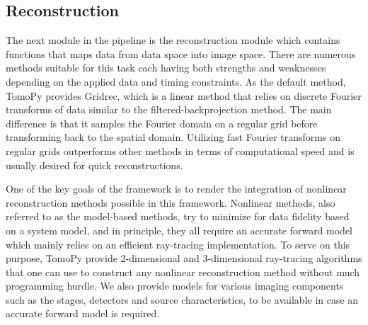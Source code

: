 \documentclass[pdf]{iucr}              %
\begin{document}
\subsection{Reconstruction}

The next module in the pipeline is the reconstruction module which contains functions that maps data from data space into image space. There are numerous methods suitable for this task each having both strengths and weaknesses depending on the applied data and timing constraints. As the default method, TomoPy provides Gridrec, which is a linear method that relies on discrete Fourier transforms of data similar to the filtered-backprojection method. The main difference is that it samples the Fourier domain on a regular grid before transforming back to the spatial domain. Utilizing fast Fourier transforms on regular grids outperforms other methods in terms of computational speed and is usually desired for quick reconstructions.

One of the key goals of the framework is to render the integration of nonlinear reconstruction methods possible in this framework. Nonlinear methods, also referred to as the model-based methods, try to minimize for data fidelity based on a system model, and in principle, they all require an accurate forward model which mainly relies on an efficient ray-tracing implementation. To serve on this purpose, TomoPy provide 2-dimensional and 3-dimensional ray-tracing algorithms that one can use to construct any nonlinear reconstruction method without much programming hurdle. We also provide models for various imaging components such as the stages, detectors and source characteristics, to be available in case an accurate forward model is required. 
\end{document}
